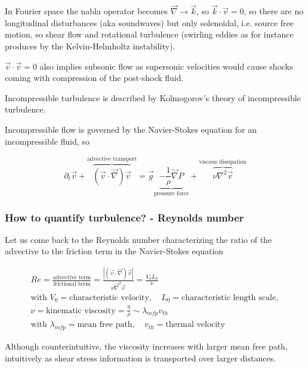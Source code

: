 In Fourier space the nabla operator becomes $\vec{\nabla} \rightarrow \vec{k}$, so $\vec{k} \cdot \vec{v} = 0$, so there
are no longitudinal disturbances (aka soundwaves) but only solenoidal, i.e. source free motion, so shear flow and rotational turbulence
(swirling eddies as for instance produces by the Kelvin-Helmholtz instability).

$\vec{v} \cdot \vec{v} = 0$ also implies subsonic flow as supersonic velocities would cause shocks coming with compression of the post-shock fluid.

\textcolor{blue1}{Incompressible turbulence is described by Kolmogorov's theory of incompressible turbulence}.

Incompressible flow is governed by the Navier-Stokes equation for an incompressible fluid, so

\begin{equation}
    \partial_t \vec{v} + \overbrace{(\vec{v} \cdot \vec{\nabla}) \vec{v}}^{\text{advective transport}} = \vec{g} \underbrace{- \frac{1}{\rho} \vec{\nabla} P}_{\text{pressure force}} + \overbrace{\nu \nabla^2 \vec{v}}^{\text{viscous dissipation}}
\end{equation}

\subsubsection{How to quantify turbulence? - Reynolds number}
Let us come back to the Reynolds number characterizing the ratio of the advective to the friction term in the Navier-Stokes equation

\begin{equation}
    \begin{gathered}
        Re = \frac{\text{advective term}}{\text{frictional term}} = \frac{|(\vec{v}\cdot \vec{\nabla})\vec{v}|}{\nu \vec{\nabla}^2 \vec{v}} = \frac{V_0 L_0}{\nu} \\
        \text{with } V_0 = \text{characteristic velocity}, \quad L_0 = \text{characteristic length scale}, \\ \nu = \text{kinematic viscosity} = \frac{\eta}{\rho} \sim \lambda_{mfp} v_{th} \\
        \text{with } \lambda_{mfp} = \text{mean free path}, \quad v_{th} = \text{thermal velocity}
    \end{gathered}
\end{equation}

Although counterintuitive, the viscosity increases with larger mean free path, intuitively as shear stress information is transported
over larger distances.

